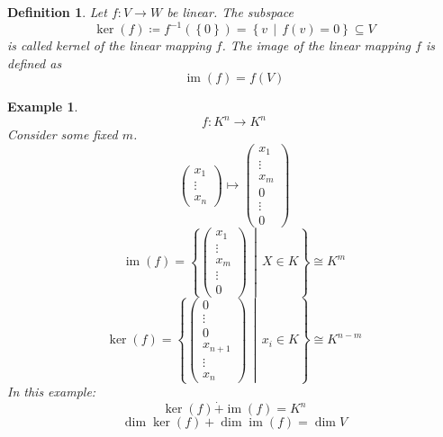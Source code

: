 \documentclass[a4paper,landscape,twocolumn]{article}
\newcommand\set[1]{\left\{#1\right\}}
\newcommand\setdef[2]{\left\{#1\,\middle|\,#2\right\}}
\newtheorem{defi}{Definition}[section]
\newtheorem{ex}{Example}[section]
\begin{document}
\begin{defi}
  Let $f: V \rightarrow W$ be linear.
  The subspace
  \[ \operatorname{ker}(f) \coloneqq f^{-1}(\set{0}) = \setdef{v}{f(v) = 0} \subseteq V \]
  is called \emph{kernel} of the linear mapping $f$.
  The \emph{image} of the linear mapping $f$ is defined as
  \[ \operatorname{im}(f) = f(V) \]
\end{defi}
%
\begin{ex}
  \[ f: K^n \rightarrow K^n \]
  Consider some fixed $m$.
  \[
    \begin{pmatrix} x_1 \\ \vdots \\ x_n \end{pmatrix}
    \mapsto
    \begin{pmatrix} x_1 \\ \vdots \\ x_m \\ 0 \\ \vdots \\ 0 \end{pmatrix}
  \]
  \[
    \operatorname{im}(f) = \setdef{\begin{pmatrix} x_1 \\ \vdots \\ x_m \\ \vdots \\ 0 \end{pmatrix}}{X \in K}
    \cong
    K^m
  \] \[
    \operatorname{ker}(f) = \setdef{\begin{pmatrix} 0 \\ \vdots \\ 0 \\ x_{n+1} \\ \vdots \\ x_n \end{pmatrix}}{x_i \in K}
    \cong K^{n-m}
  \]
  In this example:
  \[ \operatorname{ker}(f) \dot{+} \operatorname{im}(f) = K^n \]
  \[ \dim{\operatorname{ker}(f)} + \dim{\operatorname{im}(f)} = \dim{V} \]
\end{ex}
\end{document}
